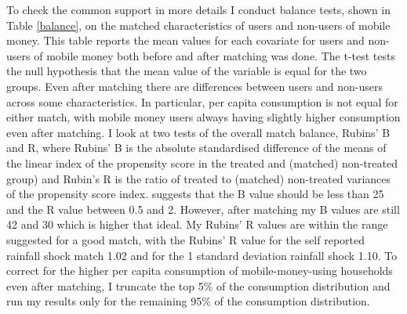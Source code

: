 To check the common support in more details I conduct balance tests, shown in Table \ref{balance}, on the matched characteristics of users and non-users of mobile money. This table reports the mean values for each covariate for users and non-users of mobile money both before and after matching was done. The t-test tests the null hypothesis that the mean value of the variable is equal for the two groups. Even after matching there are differences between users and non-users across some characteristics. In particular, per capita consumption is not equal for either match, with mobile money users always having slightly higher consumption even after matching. I look at two tests of the overall match balance, Rubins' B and R, where Rubins' B is the absolute standardised difference of the means of the linear index of the propensity score in the treated and (matched) non-treated group) and Rubin's R is the ratio of treated to (matched) non-treated variances of the propensity score index. \cite{rubin2001} suggests that the B value should be less than 25 and the R value between 0.5 and 2. However, after matching my B values are still 42 and 30 which is higher that ideal. My Rubins' R values are within the range suggested for a good match, with the Rubins' R value for the self reported rainfall shock match 1.02 and for the 1 standard deviation rainfall shock 1.10. To correct for the higher per capita consumption of mobile-money-using households even after matching, I truncate the top 5\% of the consumption distribution and run my results only for the remaining 95\% of the consumption distribution. 




\clearpage
